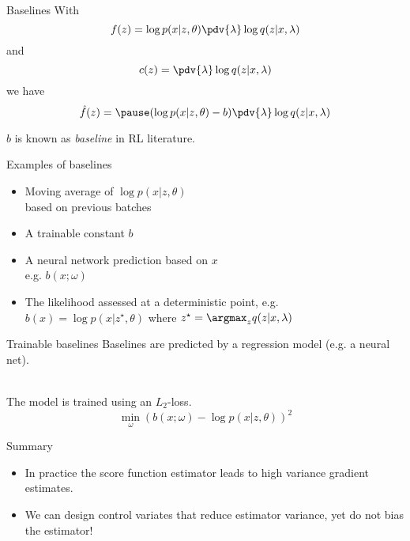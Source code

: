 \begin{frame}{Baselines}
With
\begin{equation*}
f(z) = \log p(x|z, \theta) \pdv{\lambda} \log q(z|x, \lambda)
\end{equation*}
and 
\begin{equation*}
c(z) = \pdv{\lambda} \log q(z|x, \lambda)
\end{equation*}
we have 
\begin{equation*}
\hat f(z) = \pause (\log p(x|z, \theta) - b) \pdv{\lambda} \log q(z|x, \lambda) 
\end{equation*}

\pause
$b$ is known as \emph{baseline} in RL literature.
\end{frame}

\begin{frame}{Examples of baselines}

\begin{itemize}
	\item Moving average of $\log p(x|z, \theta)$ \\
	 based on previous batches \pause
	\item A trainable constant $b$ \pause
	\item A neural network prediction based on $x$\\
	e.g. $b(x; \omega)$ \pause
	\item The likelihood assessed at a deterministic point, e.g. \\
	$b(x) = \log p(x|z^\star, \theta)$ where $z^\star = \argmax_z q(z|x, \lambda)$
\end{itemize}
\end{frame}


\begin{frame}{Trainable baselines}
Baselines are predicted by a regression model (e.g. a neural net). \\

~

The model is trained using 
an $ L_{2} $-loss.
\begin{equation*}
\min_\omega \left(b(x; \omega) - \log p(x|z,\theta)\right)^{2}
\end{equation*}
\end{frame}

\begin{frame}{Summary}
    
\begin{itemize}
    \item In practice the score function estimator leads to high variance gradient estimates. \pause
    \item We can design control variates that reduce estimator variance, yet do not bias the estimator!
\end{itemize}

\end{frame}



